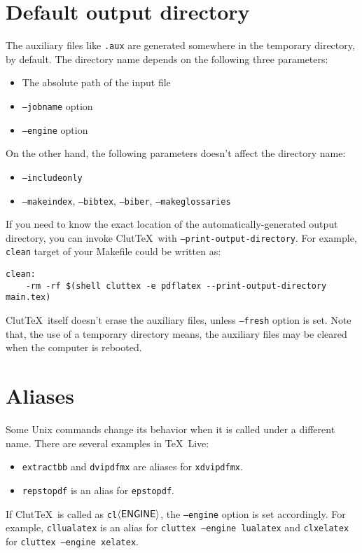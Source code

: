 \documentclass[a4paper]{report}
\newcommand\ClutTeX{Clut\TeX}
\newcommand\metavar[1]{\textnormal{\textsf{#1}}}
\begin{document}
\section{Default output directory}
The auxiliary files like \texttt{.aux} are generated somewhere in the temporary directory, by default.
The directory name depends on the following three parameters:
\begin{itemize}
\item The absolute path of the input file
\item \texttt{--jobname} option
\item \texttt{--engine} option
\end{itemize}
On the other hand, the following parameters doesn't affect the directory name:
\begin{itemize}
\item \texttt{--includeonly}
\item \texttt{--makeindex}, \texttt{--bibtex}, \texttt{--biber}, \texttt{--makeglossaries}
\end{itemize}

If you need to know the exact location of the automatically-generated output directory, you can invoke \ClutTeX\ with \texttt{--print-output-directory}.
For example, \texttt{clean} target of your Makefile could be written as:
\begin{verbatim}
clean:
    -rm -rf $(shell cluttex -e pdflatex --print-output-directory main.tex)
\end{verbatim}

\ClutTeX\ itself doesn't erase the auxiliary files, unless \texttt{--fresh} option is set.
Note that, the use of a temporary directory means, the auxiliary files may be cleared when the computer is rebooted.

\section{Aliases}
Some Unix commands change its behavior when it is called under a different name.
There are several examples in \TeX\ Live:
\begin{itemize}
\item \texttt{extractbb} and \texttt{dvipdfmx} are aliases for \texttt{xdvipdfmx}.
\item \texttt{repstopdf} is an alias for \texttt{epstopdf}.
\end{itemize}

If \ClutTeX\ is called as \texttt{cl}\(\langle\text{\metavar{ENGINE}}\rangle\), the \texttt{--engine} option is set accordingly.
For example, \texttt{cllualatex} is an alias for \texttt{cluttex --engine lualatex} and \texttt{clxelatex} for \texttt{cluttex --engine xelatex}.
\end{document}
